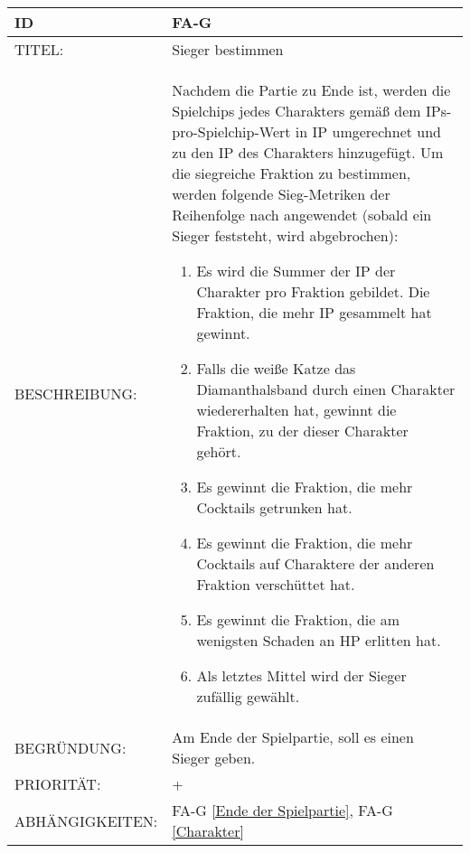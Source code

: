 \begin{tabularx}{16cm}{l|X}
	{table}\label{Sieger bestimmen}
	\textbf{ID} & \textbf{FA-G \arabic{table}} \\
	\hline
	TITEL: & Sieger bestimmen \\
	\hline
	BESCHREIBUNG: & Nachdem die Partie zu Ende ist, werden die Spielchips jedes Charakters gemäß dem IPs-pro-Spielchip-Wert in IP umgerechnet und zu den IP des Charakters hinzugefügt. Um die siegreiche Fraktion zu bestimmen, werden folgende Sieg-Metriken der Reihenfolge nach angewendet (sobald ein Sieger feststeht, wird abgebrochen):
	\begin{enumerate}
		\item Es wird die Summer der IP der Charakter pro Fraktion gebildet. Die Fraktion, die mehr IP gesammelt hat gewinnt.
		\item Falls die weiße Katze das Diamanthalsband durch einen Charakter wiedererhalten hat, gewinnt die Fraktion, zu der dieser Charakter gehört.
		\item Es gewinnt die Fraktion, die mehr Cocktails getrunken hat.
		\item Es gewinnt die Fraktion, die mehr Cocktails auf Charaktere der anderen Fraktion verschüttet hat.
		\item Es gewinnt die Fraktion, die am wenigsten Schaden an HP erlitten hat.
		\item Als letztes Mittel wird der Sieger zufällig gewählt.
	\end{enumerate}\\
	\hline
	BEGRÜNDUNG: & Am Ende der Spielpartie, soll es einen Sieger geben. \\
	\hline
	PRIORITÄT: & +\\
	\hline
	ABHÄNGIGKEITEN: & FA-G \ref{Ende der Spielpartie}, FA-G \ref{Charakter} \\
\end{tabularx}
